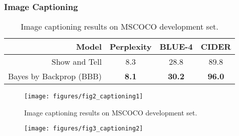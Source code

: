 \begin{frame}
  \frametitle{Image Captioning}
  \begin{table}[H]
    \caption{Image captioning results on MSCOCO development set.}
    \label{tab:captioning}
    \vskip 0.15in
    \centering
    \small
    \begin{tabular}{r|c|c|c}
      \textbf{Model}             & \textbf{Perplexity} & \textbf{BLUE-4} & \textbf{CIDER}\\ 
      \hline
      Show and Tell                &      8.3          &  28.8    & 89.8  \\
      Bayes by Backprop  (BBB)	 & 	    {\bf 8.1 }       & {\bf 30.2}	& {\bf 96.0}	\\
      \hline
    \end{tabular}
    \vskip -0.1in
  \end{table}
\end{frame}


\begin{frame}
  \begin{figure}[H]    
    \centering
    \texttt{[image: figures/fig2\_captioning1]}
    \caption{Image captioning results on MSCOCO development set.}
    \label{fig:caption}
  \end{figure}
\end{frame}


\begin{frame}
  \begin{figure}[H]
    \centering
    \texttt{[image: figures/fig3\_captioning2]}
    \label{fig:caption}
  \end{figure}
\end{frame}